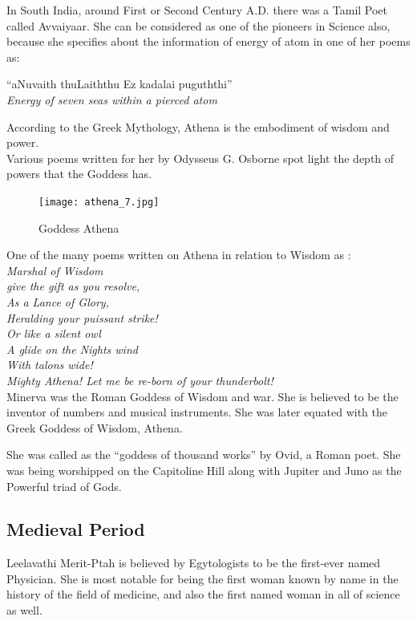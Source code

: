 \documentclass[a4paper,10pt]{article}
\begin{document}
In South India, around First or Second Century A.D. there was a Tamil Poet called Avvaiyaar. She can be considered as one of the pioneers in Science also, because she specifies about the information of energy of atom in one of her poems as: \\
\begin{center}
``aNuvaith thuLaiththu Ez kadalai puguththi'' \\
\textit{Energy of seven seas within a pierced atom}\\
\end{center}
\newblock
According to the Greek Mythology, Athena is the embodiment of wisdom and power.\\
Various poems written for her by Odysseus G. Osborne spot light the depth of powers that the Goddess has.\\
\begin{center}
\begin{figure}[h]
\centering
 \texttt{[image: athena\_7.jpg]}
 \caption{Goddess Athena}
\end{figure}
\end{center}

One of the many poems written on Athena in relation to Wisdom as \cite{athena}:\\


\textit{Marshal of Wisdom}\\
\textit{give the gift as you resolve,}\\
\textit{As a Lance of Glory,}\\
\textit{Heralding your puissant strike!}\\
\textit{Or like a silent owl}\\
\textit{A glide on the Nights wind}\\
\textit{With talons wide!}\\
\textit{Mighty Athena! Let me be re-born of your thunderbolt!}\\

\newblock
Minerva was the Roman Goddess of Wisdom and war. She is believed to be the inventor of numbers and musical instruments. She was later equated with the Greek Goddess of Wisdom, Athena.

She was called as the “goddess of thousand works” by Ovid, a Roman poet. She was being worshipped on the Capitoline Hill along with Jupiter and Juno as the Powerful triad of Gods.

\subsection{Medieval Period}
Leelavathi
\newblock
Merit-Ptah is believed by Egytologists to be the first-ever named Physician. She is most notable for being the first woman known by name in the history of the field of medicine, and also the first named woman in all of science as well.\\
\end{document}
